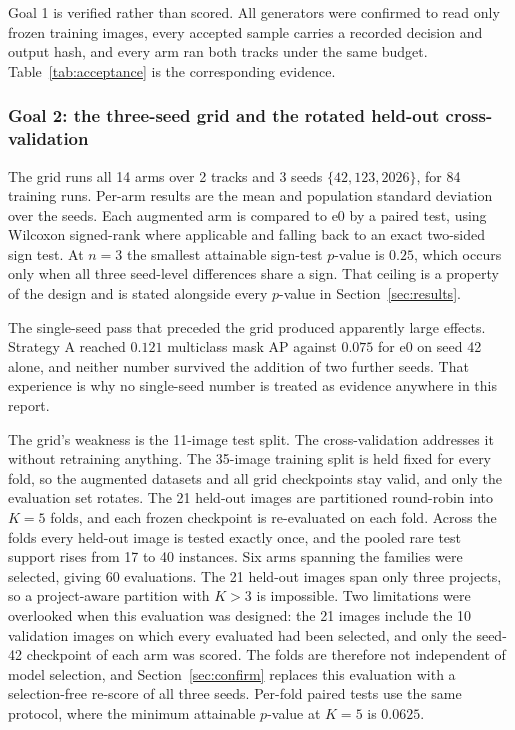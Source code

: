 Goal 1 is verified rather than scored. All generators were confirmed to read
only frozen training images, every accepted sample carries a recorded decision
and output hash, and every arm ran both tracks under the same budget.
Table~\ref{tab:acceptance} is the corresponding evidence.

\subsubsection{Goal 2: the three-seed grid and the rotated held-out cross-validation}

The grid runs all 14 arms over 2 tracks and 3 seeds $\{42, 123, 2026\}$, for 84
training runs. Per-arm results are the mean and population standard deviation
over the seeds. Each augmented arm is compared to e0 by a paired test, using
Wilcoxon signed-rank where applicable and falling back to an exact two-sided
sign test. At $n=3$ the smallest attainable sign-test $p$-value is $0.25$, which
occurs only when all three seed-level differences share a sign. That ceiling is
a property of the design and is stated alongside every $p$-value in
Section~\ref{sec:results}.

The single-seed pass that preceded the grid produced apparently large effects.
Strategy A reached $0.121$ multiclass mask AP against $0.075$ for e0 on seed 42
alone, and neither number survived the addition of two further seeds. That
experience is why no single-seed number is treated as evidence anywhere in this
report.

The grid's weakness is the 11-image test split. The cross-validation addresses
it without retraining anything. The 35-image training split is held fixed for
every fold, so the augmented datasets and all grid checkpoints stay valid, and
only the evaluation set rotates. The 21 held-out images are partitioned
round-robin into $K=5$ folds, and each frozen checkpoint is re-evaluated on each
fold. Across the folds every held-out image is tested exactly once, and the
pooled rare test support rises from 17 to 40 instances. Six arms spanning the
families were selected, giving 60 evaluations. The 21 held-out images span only three projects, so a project-aware partition
with $K>3$ is impossible. Two limitations were overlooked when this evaluation
was designed: the 21 images include the 10 validation images on which every
evaluated  had been selected, and only the seed-42 checkpoint of
each arm was scored. The folds are therefore not independent of model
selection, and Section~\ref{sec:confirm} replaces this evaluation with a
selection-free re-score of all three seeds. Per-fold paired
tests use the same protocol, where the minimum attainable $p$-value at $K=5$ is
$0.0625$.

